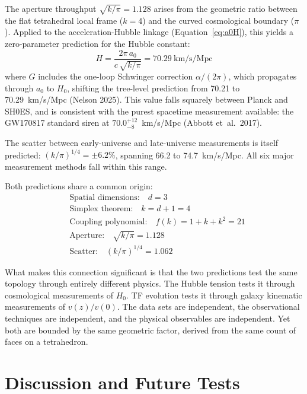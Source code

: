 \documentclass[aps,prd,preprint,superscriptaddress,showpacs,preprintnumbers,amsmath,amssymb,nofootinbib]{revtex4-2}
\begin{document}
The aperture throughput $\sqrt{k/\pi} = 1.128$ arises from the geometric ratio between the flat tetrahedral local frame ($k = 4$) and the curved cosmological boundary ($\pi$). Applied to the acceleration-Hubble linkage (Equation~\ref{eq:a0H}), this yields a zero-parameter prediction for the Hubble constant:
\begin{equation}
H = \frac{2\pi\,a_0}{c\,\sqrt{k/\pi}} = 70.29~\mathrm{km/s/Mpc}
\label{eq:H0}
\end{equation}
where $G$ includes the one-loop Schwinger correction $\alpha/(2\pi)$, which propagates through $a_0$ to $H_0$, shifting the tree-level prediction from 70.21 to 70.29~km/s/Mpc (Nelson 2025). This value falls squarely between Planck and SH0ES, and is consistent with the purest spacetime measurement available: the GW170817 standard siren at $70.0^{+12}_{-8}$~km/s/Mpc (Abbott et~al.\ 2017).

The scatter between early-universe and late-universe measurements is itself predicted: $(k/\pi)^{1/4} = \pm 6.2\%$, spanning 66.2 to 74.7~km/s/Mpc. All six major measurement methods fall within this range.

Both predictions share a common origin:
\begin{align}
&\text{Spatial dimensions:}\quad d = 3 \nonumber\\
&\text{Simplex theorem:}\quad k = d + 1 = 4 \nonumber\\
&\text{Coupling polynomial:}\quad f(k) = 1 + k + k^2 = 21 \nonumber\\
&\text{Aperture:}\quad \sqrt{k/\pi} = 1.128 \nonumber\\
&\text{Scatter:}\quad (k/\pi)^{1/4} = 1.062
\end{align}

What makes this connection significant is that the two predictions test the same topology through entirely different physics. The Hubble tension tests it through cosmological measurements of $H_0$. TF evolution tests it through galaxy kinematic measurements of $v(z)/v(0)$. The data sets are independent, the observational techniques are independent, and the physical observables are independent. Yet both are bounded by the same geometric factor, derived from the same count of faces on a tetrahedron.

\section{Discussion and Future Tests}
\label{sec:discussion}
\end{document}
